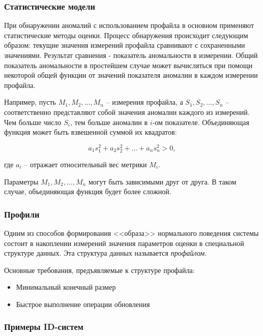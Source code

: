 \subsubsection{Статистические модели}

При обнаружении аномалий с использованием профайла в основном применяют статистические 
методы оценки. Процесс обнаружения происходит следующим образом: текущие значения измерений 
профайла сравнивают с сохраненными значениями. Результат сравнения - показатель аномальности 
в измерении. Общий показатель аномальности в простейшем случае может вычисляться при помощи 
некоторой общей функции от значений показателя аномалии в каждом измерении профайла.

Например, пусть $M_1, M_2, \dots, M_n$ -- измерения профайла, а $S_1, S_2, \dots, S_n$ -- 
соответственно представляют собой значения аномалии каждого из измерений. Чем больше 
число $S_i$, тем больше аномалии в $i$-ом показателе. Объединяющая функция может быть 
взвешенной суммой их квадратов:

\begin{equation}
	a_1s_1^2 + a_2s_2^2 + \dots + a_ns_n^2 > 0,
\end{equation}

где $a_i$ -- отражает относительный вес метрики $M_i$.

Параметры $M_1, M_2, \dots, M_n$ могут быть зависимыми друг от друга. В таком случае, 
объединяющая функция будет более сложной.



\subsubsection{Профили}

Одним из способов формирования <<образа>> нормального поведения системы состоит в 
накоплении измерений значения параметров оценки в специальной структуре данных. 
Эта структура данных называется \textit{профайлом}. 

Основные требования, предъявляемые к структуре профайла:
\begin{itemize}
	\item Минимальный конечный размер
	
	\item Быстрое выполнение операции обновления
\end{itemize}



\subsubsection{Примеры ID-систем}


